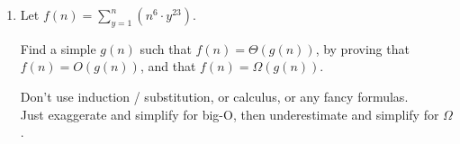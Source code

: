 \documentclass[12pt]{article}
\begin{document}
\begin{enumerate}
\newpage



\item  
Let $f(n) = \sum^n_{y{=}1} (n^6\cdot y^{23})$. 

Find a simple $g(n)$ such that $f(n) = \Theta(g(n))$, by proving that 
$f(n)=O(g(n))$, and that $f(n) = \Omega(g(n))$.

Don't use induction / substitution, or calculus, or any fancy formulas.  \\
Just exaggerate and simplify for big-O, then underestimate and simplify for $\Omega$.\\


{\color{blue}{\bf Answer:\\}}


\end{enumerate} 
\end{document}
